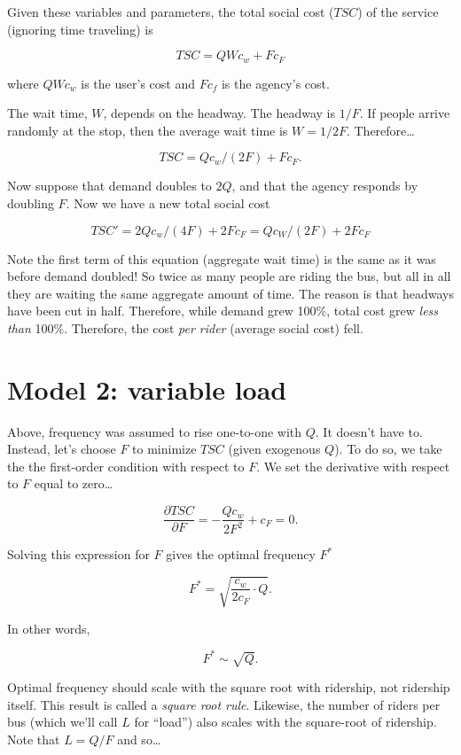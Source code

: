 \documentclass[11pt]{article}
\begin{document}
Given these variables and parameters, the total social cost (\(TSC\)) of
the service (ignoring time traveling) is

\[TSC = Q W c_w + Fc_F\]

where \(QWc_w\) is the user's cost and \(Fc_f\) is the agency's cost.

The wait time, \(W\), depends on the headway. The headway is \(1/F\). If
people arrive randomly at the stop, then the average wait time is
\(W=1/2F\). Therefore\ldots{}

\[TSC=Qc_w /(2F) + Fc_F.\]

Now suppose that demand doubles to \(2Q\), and that the agency responds
by doubling \(F\). Now we have a new total social cost

\[TSC'=2Qc_w/(4F) + 2Fc_F = Qc_W/(2F) + 2Fc_F\]

Note the first term of this equation (aggregate wait time) is the same
as it was before demand doubled! So twice as many people are riding the
bus, but all in all they are waiting the same aggregate amount of time.
The reason is that headways have been cut in half. Therefore, while
demand grew 100\%, total cost grew \emph{less than} 100\%. Therefore,
the cost \emph{per rider} (average social cost) fell.

    \section{Model 2: variable load}\label{model-2-variable-load}

Above, frequency was assumed to rise one-to-one with \(Q\). It doesn't
have to. Instead, let's choose \(F\) to minimize \(TSC\) (given
exogenous \(Q\)). To do so, we take the the first-order condition with
respect to \(F\). We set the derivative with respect to \(F\) equal to
zero\ldots{}

\[\frac{\partial TSC}{\partial F}= -\frac{Qc_w}{2F^2} + c_F = 0.\]

Solving this expression for \(F\) gives the optimal frequency \(F^*\)

\[F^* = \sqrt{\frac{c_w}{2c_F}\cdot Q}.\]

In other words,

\[ F^* \sim \sqrt{Q}.\]

Optimal frequency should scale with the square root with ridership, not
ridership itself. This result is called a \emph{square root rule}.
Likewise, the number of riders per bus (which we'll call \(L\) for
``load'') also scales with the square-root of ridership. Note that
\(L = Q/F\) and so\ldots{}
\end{document}
